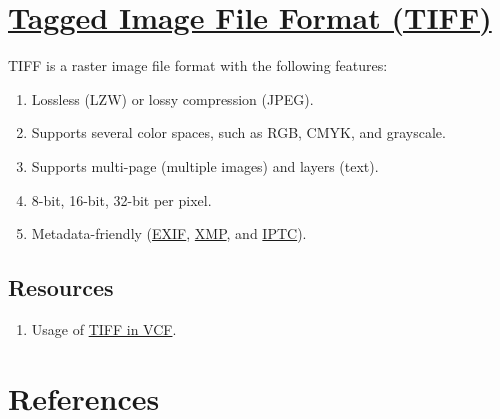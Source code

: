 \section{\href{https://en.wikipedia.org/wiki/TIFF}{Tagged Image File
  Format (TIFF)}}

TIFF is a raster image file format with the following features:
\begin{enumerate}
\item Lossless (LZW) or lossy compression (JPEG).
\item Supports several color spaces, such as RGB, CMYK, and grayscale.
\item Supports multi-page (multiple images) and layers (text).
\item 8-bit, 16-bit, 32-bit per pixel.
\item Metadata-friendly
  (\href{https://en.wikipedia.org/wiki/Exif}{EXIF},
  \href{https://en.wikipedia.org/wiki/Extensible_Metadata_Platform}{XMP},
  and
  \href{https://en.wikipedia.org/wiki/IPTC_Information_Interchange_Model}{IPTC}).
\end{enumerate}

\subsection*{Resources}
\begin{enumerate}
\item Usage of
  \href{https://github.com/Sistemas-Multimedia/VCF/blob/main/notebooks/PNG.ipynb}{TIFF
    in VCF}.
\end{enumerate}



\section{References}

\renewcommand{\addcontentsline}[3]{}%

